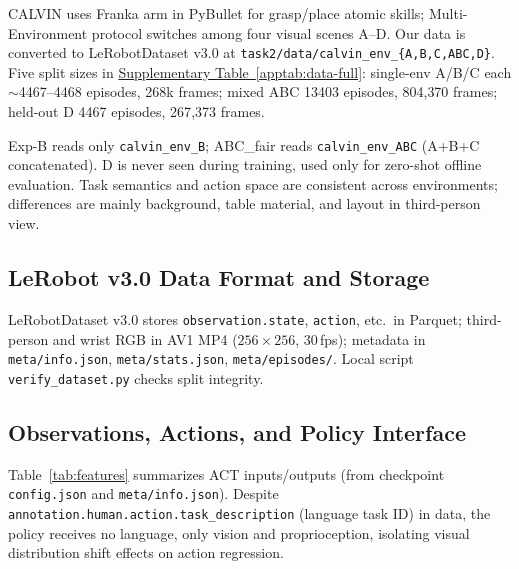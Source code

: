 \documentclass[10pt,twocolumn,letterpaper]{article}
\newcounter{apptab}
\newcommand{\apptabref}[1]{\hyperref[#1]{Supplementary Table~\ref*{#1}}}
\newcommand{\tabref}[1]{Table~\ref{#1}}
\begin{document}
CALVIN\cite{mees2022calvin} uses Franka arm in PyBullet for grasp/place atomic skills; Multi-Environment protocol switches among four visual scenes A--D. Our data is converted to LeRobotDataset v3.0\cite{lerobot2025datasetv3} at \texttt{task2/data/calvin\_env\_\{A,B,C,ABC,D\}}. Five split sizes in \apptabref{apptab:data-full}: single-env A/B/C each $\sim$4467--4468 episodes, 268k frames; mixed ABC 13403 episodes, 804{,}370 frames; held-out D 4467 episodes, 267{,}373 frames.

Exp-B reads only \texttt{calvin\_env\_B}; ABC\_fair reads \texttt{calvin\_env\_ABC} (A+B+C concatenated). D is never seen during training, used only for zero-shot offline evaluation. Task semantics and action space are consistent across environments; differences are mainly background, table material, and layout in third-person view.

\subsection{LeRobot v3.0 Data Format and Storage}

LeRobotDataset v3.0 stores \texttt{observation.state}, \texttt{action}, etc.\ in Parquet; third-person and wrist RGB in AV1 MP4 ($256{\times}256$, 30\,fps); metadata in \texttt{meta/info.json}, \texttt{meta/stats.json}, \texttt{meta/episodes/}. Local script \texttt{verify\_dataset.py} checks split integrity.

\subsection{Observations, Actions, and Policy Interface}
\label{sec:dataset-policy}

\tabref{tab:features} summarizes ACT inputs/outputs (from checkpoint \texttt{config.json} and \texttt{meta/info.json}). Despite \texttt{annotation.human.action.task\_description} (language task ID) in data, the policy receives no language, only vision and proprioception, isolating visual distribution shift effects on action regression.

\begin{table}[H]
  \centering
  \caption{Policy I/O and dataset features used in this work}
  \label{tab:features}
  \footnotesize
\end{table}
\end{document}
